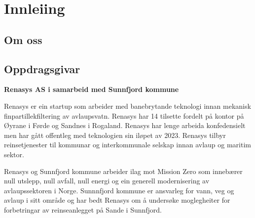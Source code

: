 \chapter{Innleiing}
\thispagestyle{fancy}

\section{Om oss}




\section{Oppdragsgivar}
\textbf{Renasys AS i samarbeid med Sunnfjord kommune}

Renasys er ein startup som arbeider med banebrytande teknologi innan mekanisk finpartillekfiltering av avlaupsvatn.
Renasys har 14 tilsette fordelt på kontor på Øyrane i Førde og Sandnes i Rogaland. Renasys har lenge arbeida konfedensielt men har gått offentleg med teknologien sin iløpet av 2023. Renasys tilbyr reinsetjenester til kommunar og interkommunale selskap innan avlaup og maritim sektor.

Renasys og Sunnfjord kommune arbeider ilag mot Mission Zero som innebærer null utslepp, null avfall, null energi og ein generell modernisering av avlaupssektoren i Norge.
Sunnnfjord kommune er ansvarleg for vann, veg og avlaup i sitt område og har bedt Renasys om å undersøke moglegheiter for forbetringar av reinseanlegget på Sande i Sunnfjord.